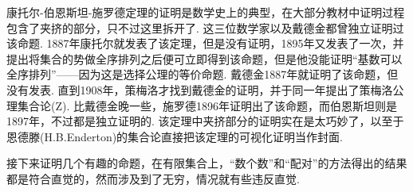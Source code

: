 \documentclass[main.tex]{subfiles}
\begin{document}
\begin{note}
    康托尔-伯恩斯坦-施罗德定理的证明是数学史上的典型，在大部分教材中证明过程包含了夹挤的部分，只不过这里拆开了. 这三位数学家以及戴德金都曾独立证明过该命题. 1887年康托尔就发表了该定理，但是没有证明，1895年又发表了一次，并提出将集合的势做全序排列之后便可立即得到该命题，但是他没能证明“基数可以全序排列”——因为这是选择公理的等价命题. 戴德金1887年就证明了该命题，但没有发表. 直到1908年，策梅洛才找到戴德金的证明，并于同一年提出了策梅洛公理集合论(\textsf{Z}). 比戴德金晚一些，施罗德1896年证明出了该命题，而伯恩斯坦则是1897年，不过都是独立证明的. 该定理中夹挤部分的证明实在是太巧妙了，以至于恩德滕(H.B.Enderton)的集合论直接把该定理的可视化证明当作封面.
\end{note}

接下来证明几个有趣的命题，在有限集合上，“数个数”和“配对”的方法得出的结果都是符合直觉的，然而涉及到了无穷，情况就有些违反直觉.
\end{document}
